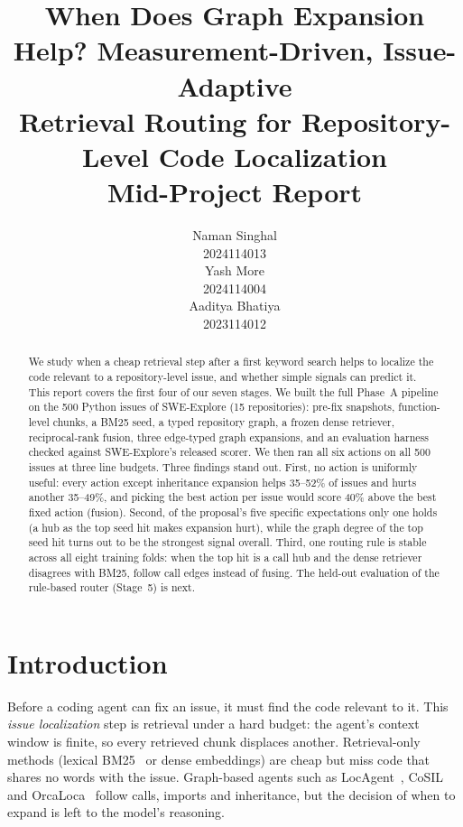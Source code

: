 \documentclass[11pt]{article}
\title{When Does Graph Expansion Help? Measurement-Driven, Issue-Adaptive\\
Retrieval Routing for Repository-Level Code Localization\\[4pt]
\large Mid-Project Report}
\author{
  Naman Singhal \\
  2024114013 \\
  \And
  Yash More \\
  2024114004 \\
  \And
  Aaditya Bhatiya \\
  2023114012
}
\begin{document}
\maketitle

\begin{abstract}
We study when a cheap retrieval step after a first keyword search helps to
localize the code relevant to a repository-level issue, and whether simple
signals can predict it. This report covers the first four of our seven
stages. We built the full Phase~A pipeline on the 500 Python issues of
SWE-Explore (15 repositories): pre-fix snapshots, function-level chunks, a
BM25 seed, a typed repository graph, a frozen dense retriever, reciprocal-rank
fusion, three edge-typed graph expansions, and an evaluation harness checked
against SWE-Explore's released scorer. We then ran all six actions on all 500
issues at three line budgets. Three findings stand out. First, no action is
uniformly useful: every action except inheritance expansion helps 35--52\% of
issues and hurts another 35--49\%, and picking the best action per issue would
score 40\% above the best fixed action (fusion). Second, of the proposal's
five specific expectations only one holds (a hub as the top seed hit makes
expansion hurt), while the graph degree of the top seed hit turns out to be
the strongest signal overall. Third, one routing rule is stable across all
eight training folds: when the top hit is a call hub and the dense retriever
disagrees with BM25, follow call edges instead of fusing. The held-out
evaluation of the rule-based router (Stage~5) is next.
\end{abstract}

\section{Introduction}

Before a coding agent can fix an issue, it must find the code relevant to it.
This \emph{issue localization} step is retrieval under a hard budget: the
agent's context window is finite, so every retrieved chunk displaces another.
Retrieval-only methods (lexical BM25~\citep{robertson2009bm25} or dense
embeddings) are cheap but miss code that shares no words with the issue.
Graph-based agents such as LocAgent~\citep{chen2025locagent},
CoSIL~\citep{jiang2025cosil} and OrcaLoca~\citep{yu2025orcaloca} follow calls,
imports and inheritance, but the decision of when to expand is left to the
model's reasoning.
\end{document}

